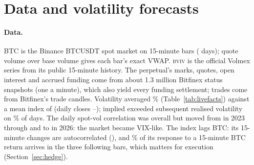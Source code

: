 \documentclass[10pt,a4paper]{article}
\newcommand{\BVIV}{\textsc{bviv}}
\begin{document}
\section{Data and volatility forecasts}\label{sec:data}

\paragraph{Data.} BTC is the Binance BTCUSDT spot market on 15-minute bars (\LiveDays{} days); quote volume over base volume gives each bar's exact VWAP. \BVIV{} is the official Volmex series from its public 15-minute history. The perpetual's marks, quotes, open interest and accrued funding come from about 1.3 million Bitfinex status snapshots (one a minute), which also yield every funding settlement; trades come from Bitfinex's trade candles. Volatility averaged \LiveRv\% (Table~\ref{tab:livefacts}) against a mean index of \LiveIv{} (daily closes \LiveIvMin--\LiveIvMax); implied exceeded subsequent realised volatility on \LiveIvAbove\% of days. The daily spot-vol correlation was \LiveCorrDaily{} overall but moved from \LiveCorrA{} in 2023 through \LiveCorrB{} and \LiveCorrC{} to \LiveCorrD{} in 2026: the market became VIX-like. The index lags BTC: its 15-minute changes are autocorrelated (\LiveAc), and \LiveLagShare\% of its response to a 15-minute BTC return arrives in the three following bars, which matters for execution (Section~\ref{sec:hedge}).

\begin{table}[t]
\centering\small

\caption{Stylised facts: live sample (\LiveStart{} to \LiveEnd) and by calendar year, against the median of the simulation's \NTest{} test paths (Section~\ref{sec:sim}).}
\label{tab:livefacts}
\end{table}
\end{document}
